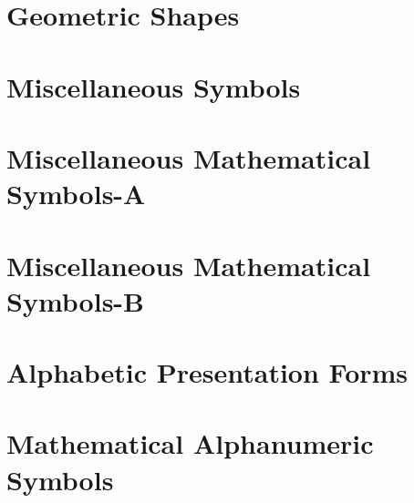 \documentclass{article}
\begin{document}
\section{Geometric Shapes}

\section{Miscellaneous Symbols}

%
\section{Miscellaneous Mathematical Symbols-A}
%
%
%
%
\section{Miscellaneous Mathematical Symbols-B}
%
%
%
\section{Alphabetic Presentation Forms}

\section{Mathematical Alphanumeric Symbols}
\end{document}
